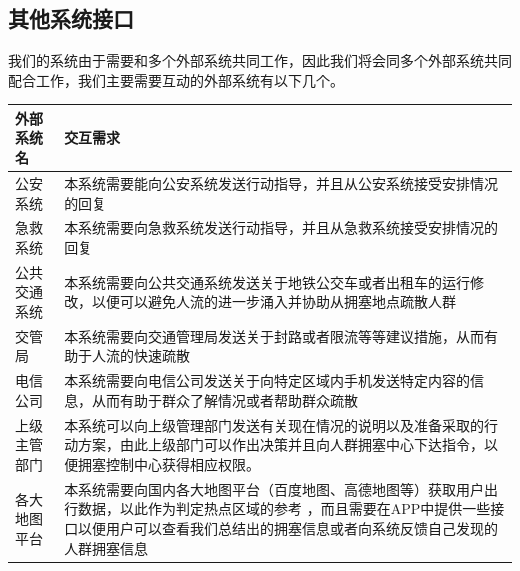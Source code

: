 \documentclass{ctexrep}
\begin{document}
\subsection{其他系统接口}
我们的系统由于需要和多个外部系统共同工作，因此我们将会同多个外部系统共同配合工作，我们主要需要互动的外部系统有以下几个。
\begin{longtable}{p{2cm}|p{10cm}}
\hline
外部系统名 & 交互需求 \\
\hline
\hline
公安系统 & 本系统需要能向公安系统发送行动指导，并且从公安系统接受安排情况的回复 \\
\hline
急救系统 & 本系统需要向急救系统发送行动指导，并且从急救系统接受安排情况的回复 \\
\hline
公共交通系统 & 本系统需要向公共交通系统发送关于地铁公交车或者出租车的运行修改，以便可以避免人流的进一步涌入并协助从拥塞地点疏散人群 \\
\hline
交管局 & 本系统需要向交通管理局发送关于封路或者限流等等建议措施，从而有助于人流的快速疏散\\
\hline
电信公司 & 本系统需要向电信公司发送关于向特定区域内手机发送特定内容的信息，从而有助于群众了解情况或者帮助群众疏散 \\
\hline
上级主管部门 & 本系统可以向上级管理部门发送有关现在情况的说明以及准备采取的行动方案，由此上级部门可以作出决策并且向人群拥塞中心下达指令，以便拥塞控制中心获得相应权限。\\
\hline
各大地图平台 & 本系统需要向国内各大地图平台（百度地图、高德地图等）获取用户出行数据，以此作为判定热点区域的参考 ，而且需要在APP中提供一些接口以便用户可以查看我们总结出的拥塞信息或者向系统反馈自己发现的人群拥塞信息\\
\hline

\end{longtable}
\end{document}
